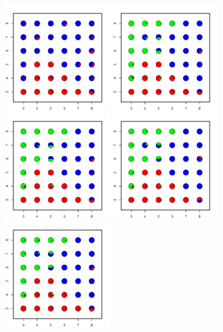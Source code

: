 \documentclass[12pt]{article}
\begin{document}
\begin{figure}
	\centering
			{\includegraphics[width=1.8in,height=1.8in]{figs/sims/simK3_sp_pies_K2.pdf}}
			{\includegraphics[width=1.8in,height=1.8in]{figs/sims/simK3_sp_pies_K3.pdf}}
			{\includegraphics[width=1.8in,height=1.8in]{figs/sims/simK3_sp_pies_K4.pdf}}
			{\includegraphics[width=1.8in,height=1.8in]{figs/sims/simK3_sp_pies_K5.pdf}}
			{\includegraphics[width=1.8in,height=1.8in]{figs/sims/simK3_sp_pies_K6.pdf}}

\end{figure}
\end{document}
